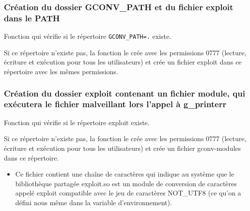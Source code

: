 \documentclass[12pt,a4paper]{article}
\newcommand{\code}[1]{\colorbox{light-gray}{\texttt{#1}}}
\begin{document}
   		\subsubsection{Création du dossier GCONV\_PATH et du fichier exploit dans le PATH} 
   		  
            \begin{flushleft}
                \noindent Fonction qui vérifie si le répertoire \code{GCONV\_PATH=.} existe. 
                \item Si ce répertoire n'existe pas, la fonction le crée avec les permissions 0777 (lecture, écriture et exécution pour tous les utilisateurs) et crée un fichier exploit dans ce répertoire avec les mêmes permissions.
            \end{flushleft}

            \newpage
            \subsubsection{Création du dossier exploit contenant un fichier module, qui exécutera le fichier malveillant lors l'appel à g\_printerr}
              
            \begin{flushleft}
                \noindent Fonction qui vérifie si le répertoire exploit existe.
                \item Si ce répertoire n'existe pas, la fonction le crée avec les permissions 0777 (lecture, écriture et exécution pour tous les utilisateurs) et crée un fichier gconv-modules dans ce répertoire. 
                \begin{itemize}
                    \item Ce fichier contient une chaîne de caractères qui indique au système que le bibliothèque partagée exploit.so est un module de conversion de caractères appelé exploit compatible avec le jeu de caractères NOT\_UTF8 (ce qu'on a défini nous même dans la variable d'environnement).
                \end{itemize}
                
            \end{flushleft}
            \newpage
\end{document}
